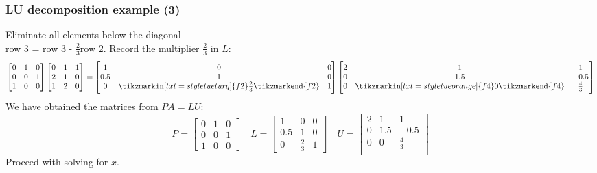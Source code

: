 \begin{frame}[fragile]
  \frametitle{LU decomposition example (3)}
    Eliminate all elements below the diagonal ---\\
    row 3 = row 3 - $\frac{2}{3}$row 2. Record the multiplier $\frac{2}{3}$ in $L$:
  \[
    \begin{bmatrix}
      0 & 1 & 0\\
      0 & 0 & 1 \\
      1 & 0 & 0
    \end{bmatrix} 
    \begin{bmatrix}
      0 & 1 & 1\\
      2 & 1 & 0\\
      1 & 2 & 0
      \end{bmatrix}= 
      \begin{bmatrix}
      1 & 0 & 0\\
      0.5 & 1 & 0\\
      0 & \tikzmarkin[txt=style tueturq]{f2}\frac{2}{3}\tikzmarkend{f2} & 1
      \end{bmatrix}
      \begin{bmatrix}
      2 & 1 & 1\\
      0 & 1.5 & -0.5 \\
      0 & \tikzmarkin[txt=style tueorange]{f4}0\tikzmarkend{f4} & \frac{4}{3}\\
      \end{bmatrix}
  \]
  \pause
  We have obtained the matrices from $PA=LU$:
  \[
    P = \begin{bmatrix}
      0 & 1 & 0\\
      0 & 0 & 1 \\
      1 & 0 & 0
    \end{bmatrix} \quad
    L=\begin{bmatrix}
      1 & 0 & 0\\
      0.5 & 1 & 0\\
      0 & \frac{2}{3} & 1
      \end{bmatrix} \quad
      U = \begin{bmatrix}
      2 & 1 & 1\\
      0 & 1.5 & -0.5 \\
      0 & 0 & \frac{4}{3}\\
      \end{bmatrix}
  \]
  Proceed with solving for $x$.
\end{frame}

